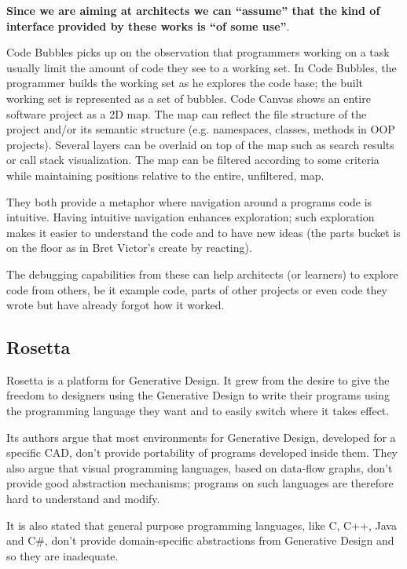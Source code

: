 \documentclass{./llncs2e/llncs}
\begin{document}
	\textbf{Since we are aiming at architects we can ``assume'' that the kind of interface provided by these works is ``of some use''}.

	Code Bubbles picks up on the observation that programmers working on a task usually limit the amount of code they see to a working set. In Code Bubbles, the programmer builds the working set as he explores the code base; the built working set is represented as a set of bubbles.
	Code Canvas shows an entire software project as a 2D map. The map can reflect the file structure of the project and/or its semantic structure (e.g. namespaces, classes, methods in OOP projects). Several layers can be overlaid on top of the map such as search results or call stack visualization. The map can be filtered according to some criteria while maintaining positions relative to the entire, unfiltered, map.

	They both provide a metaphor where navigation around a programs code is intuitive. Having intuitive navigation enhances exploration; such exploration makes it easier to understand the code and to have new ideas (the parts bucket is on the floor as in Bret Victor's create by reacting).

	The debugging capabilities from these can help architects (or learners) to explore code from others, be it example code, parts of other projects or even code they wrote but have already forgot how it worked.


\subsection{Rosetta}
	Rosetta is a platform for Generative Design. It grew from the desire to give the freedom to designers using the Generative Design to write their programs using the programming language they want and to easily switch where it takes effect.

	Its authors argue that most environments for Generative Design, developed for a specific CAD, don't provide portability of programs developed inside them. They also argue that visual programming languages, based on data-flow graphs, don't provide good abstraction mechanisms; programs on such languages are therefore hard to understand and modify.

	It is also stated that general purpose programming languages, like C, C++, Java and C\#, don't provide domain-specific abstractions from Generative Design and so they are inadequate.
\end{document}
